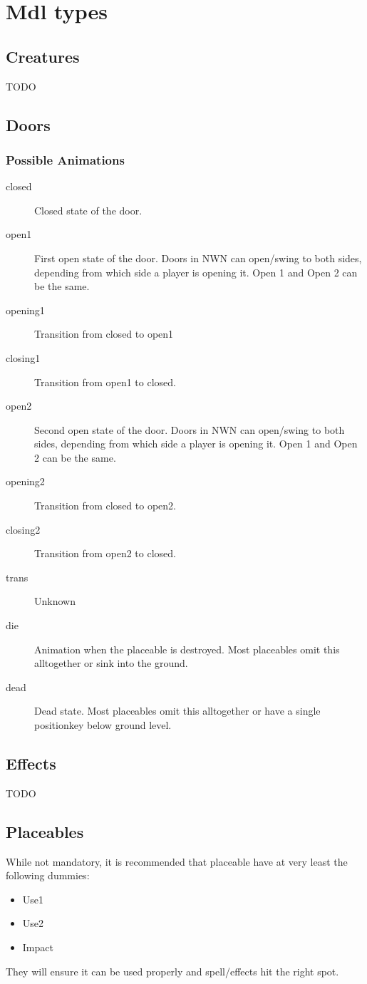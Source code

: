 \chapter{Mdl types}

\section{Creatures}
TODO

\section{Doors}

\subsection*{Possible Animations}
\begin{description}
    \item[closed] Closed state of the door.
    \item[open1] First open state of the door. Doors in NWN can open/swing to both sides, depending from which side a player is opening it. Open 1 and Open 2 can be the same.
    \item[opening1] Transition from closed to open1
    \item[closing1] Transition from open1 to closed.
    \item[open2] Second open state of the door. Doors in NWN can open/swing to both sides, depending from which side a player is opening it. Open 1 and Open 2 can be the same.
    \item[opening2] Transition from closed to open2.
    \item[closing2] Transition from open2 to closed.
    \item[trans] Unknown
    \item[die] Animation when the placeable is destroyed. Most placeables omit this alltogether or sink into the ground.
    \item[dead] Dead state. Most placeables omit this alltogether or have a single positionkey below ground level.
\end{description}

\section{Effects}
TODO


\section{Placeables}
While not mandatory, it is recommended that placeable have at very least the
following dummies:
\begin{itemize}
\item Use1
\item Use2
\item Impact
\end{itemize}
They will ensure it can be used properly and spell/effects hit the right spot.

